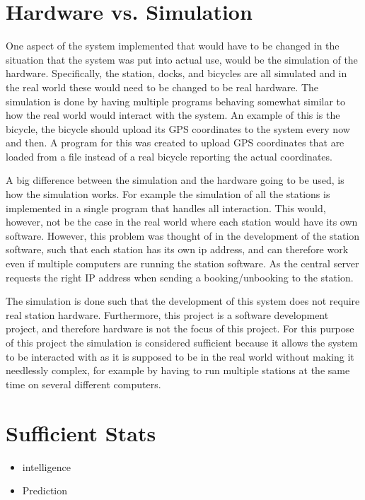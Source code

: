 \section*{Hardware vs. Simulation}
One aspect of the system implemented that would have to be changed in the situation that the system was put into actual use, would be the simulation of the hardware.
Specifically, the station, docks, and bicycles are all simulated and in the real world these would need to be changed to be real hardware.
The simulation is done by having multiple programs behaving somewhat similar to how the real world would interact with the system.
An example of this is the bicycle, the bicycle should upload its GPS coordinates to the system every now and then. 
A program for this was created to upload GPS coordinates that are loaded from a file instead of a real bicycle reporting the actual coordinates.

A big difference between the simulation and the hardware going to be used, is how the simulation works.
For example the simulation of all the stations is implemented in a single program that handles all interaction. 
This would, however, not be the case in the real world where each station would have its own software.
However, this problem was thought of in the development of the station software, such that each station has its own ip address, and can therefore work even if multiple computers are running the station software. As the central server requests the right IP address when sending a booking/unbooking to the station.

The simulation is done such that the development of this system does not require real station hardware.
Furthermore, this project is a software development project, and therefore hardware is not the focus of this project.
For this purpose of this project the simulation is considered sufficient because it allows the system to be interacted with as it is supposed to be in the real world without making it needlessly complex, for example by having to run multiple stations at the same time on several different computers.

\section*{Sufficient Stats}
	\begin{itemize}
		\item intelligence
		\item Prediction
	\end{itemize}